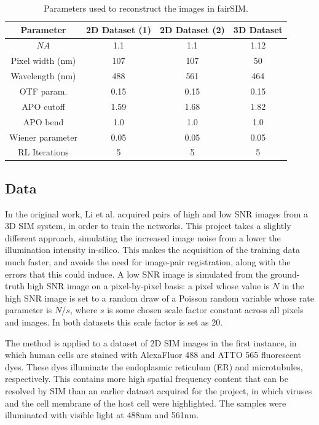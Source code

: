 \documentclass[12pt]{article}
\newcommand\NA{\mathit{NA}}
\begin{document}
\begin{table}[htp]
    \centering
    \begin{tabular}{| c | c | c | c |}
        \hline
        Parameter & 2D Dataset (1) & 2D Dataset (2) & 3D Dataset \\
        \hline
        $\NA$  & 1.1 & 1.1 & 1.12 \\
        \hline
        Pixel width (nm) & 107 & 107 & 50 \\
        \hline
        Wavelength (nm) & 488 & 561 & 464 \\
        \hline
        OTF param.  & 0.15 & 0.15 & 0.15 \\
        \hline
        APO cutoff & 1.59 & 1.68 & 1.82 \\
        \hline
        APO bend  & 1.0 & 1.0 & 1.0 \\
        \hline
        Wiener parameter & 0.05 & 0.05 & 0.05 \\
        \hline
        RL Iterations & 5 & 5 & 5\\
        \hline

    \end{tabular}
    \caption{Parameters used to reconstruct the images in fairSIM.}
    \label{tab:reconparams}
\end{table}

\subsection{Data}

In the original work, Li et al. acquired pairs of high and low SNR images from a 3D SIM system,
in order to train the networks.
This project takes a slightly different approach,
simulating the increased image noise from a lower the illumination intensity in-silico.
This makes the acquisition of the training data much faster,
and avoids the need for image-pair registration, along with the errors that this could induce.
A low SNR image is simulated from the ground-truth high SNR image on a pixel-by-pixel basis:
a pixel whose value is $N$ in the high SNR image is set to a random draw of a Poisson random variable whose rate parameter is $N$/$s$,
where $s$ is some chosen scale factor constant across all pixels and images.
In both datasets this scale factor is set as 20.

The method is applied to a dataset of 2D SIM images in the first instance,
in which human cells are stained with AlexaFluor 488 and ATTO 565 fluorescent dyes.
These dyes illuminate the endoplasmic reticulum (ER) and microtubules, respectively.
This contains more high spatial frequency content that can be resolved by SIM than an earlier dataset acquired for the project,
in which viruses and the cell membrane of the host cell were highlighted.
The samples were illuminated with visible light at 488nm and 561nm.
\end{document}
